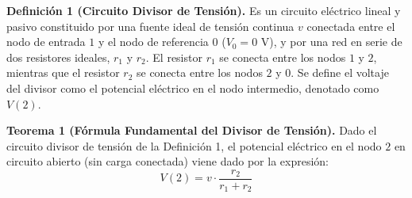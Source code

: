 \documentclass[11pt, a4paper]{article}
\theoremstyle{definition}
\theoremstyle{plain}
\theoremstyle{plain}
\theoremstyle{remark}
\theoremstyle{remark}
\theoremstyle{remark}
\begin{document}
\textbf{Definición 1 (Circuito Divisor de Tensión).} 
Es un circuito eléctrico lineal y pasivo constituido por una fuente ideal de tensión continua $v$ conectada entre el nodo de entrada $1$ y el nodo de referencia $0$ ($V_{0} = 0 \text{ V}$), y por una red en serie de dos resistores ideales, $r_1$ y $r_2$. El resistor $r_1$ se conecta entre los nodos $1$ y $2$, mientras que el resistor $r_2$ se conecta entre los nodos $2$ y $0$. Se define el voltaje del divisor como el potencial eléctrico en el nodo intermedio, denotado como $V(2)$.

\vspace{0.3cm}

\textbf{Teorema 1 (Fórmula Fundamental del Divisor de Tensión).} 
Dado el circuito divisor de tensión de la Definición 1, el potencial eléctrico en el nodo $2$ en circuito abierto (sin carga conectada) viene dado por la expresión:
\begin{equation}
	V(2) = v \cdot \frac{r_2}{r_1 + r_2}
\end{equation}
\end{document}
